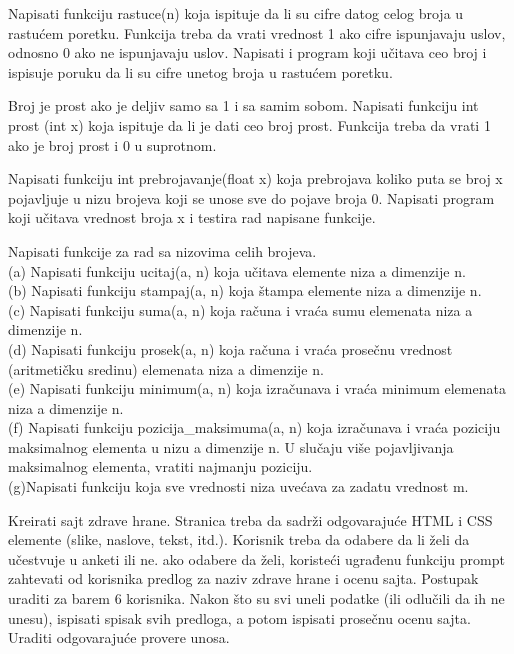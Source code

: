 \begin{primer}
Napisati funkciju rastuce(n) koja ispituje da li
su cifre datog celog broja u rastućem poretku. Funkcija treba da vrati vrednost
1 ako cifre ispunjavaju uslov, odnosno 0 ako ne ispunjavaju uslov. Napisati i
program koji učitava ceo broj i ispisuje poruku da li su cifre unetog broja u
rastućem poretku.
\end{primer}

\begin{primer}
Broj je prost ako je deljiv samo sa 1 i sa samim sobom.
Napisati funkciju int prost (int x) koja ispituje da li je dati ceo broj prost.
Funkcija treba da vrati 1 ako je broj prost i 0 u suprotnom. 
\end{primer}

\begin{primer}
Napisati funkciju int prebrojavanje(float x) koja prebrojava
koliko puta se broj x pojavljuje u nizu brojeva koji se unose sve do pojave
broja 0. Napisati program koji učitava vrednost broja x i testira rad napisane
funkcije.
\end{primer}


\begin{primer}
Napisati funkcije za rad sa nizovima celih brojeva.\\
(a) Napisati funkciju ucitaj(a, n) koja učitava elemente niza a dimenzije n.\\
(b) Napisati funkciju stampaj(a, n) koja štampa elemente niza a dimenzije n.\\
(c) Napisati funkciju suma(a, n) koja računa i vraća sumu
elemenata niza a dimenzije n.\\
(d) Napisati funkciju prosek(a, n) koja računa i vraća prosečnu
vrednost (aritmetičku sredinu) elemenata niza a dimenzije n.\\
(e) Napisati funkciju minimum(a, n) koja izračunava i vraća
minimum elemenata niza a dimenzije n.\\
(f) Napisati funkciju pozicija\_maksimuma(a, n) koja izračunava
i vraća poziciju maksimalnog elementa u nizu a dimenzije n. U slučaju
više pojavljivanja maksimalnog elementa, vratiti najmanju poziciju.\\
(g)Napisati funkciju koja sve vrednosti niza uvećava za zadatu vrednost m.
\end{primer}

\begin{primer}
Kreirati sajt zdrave hrane. Stranica treba da sadrži odgovarajuće HTML i CSS elemente (slike, naslove, tekst, itd.). Korisnik treba da odabere da li želi da učestvuje u anketi ili ne. ako odabere da želi, koristeći ugrađenu funkciju prompt zahtevati od korisnika predlog za naziv zdrave hrane i ocenu sajta. Postupak uraditi za barem 6 korisnika. Nakon što su svi uneli podatke (ili odlučili da ih ne unesu), ispisati spisak svih predloga, a potom ispisati prosečnu ocenu sajta. Uraditi odgovarajuće provere unosa.   
\end{primer}
\newpage


